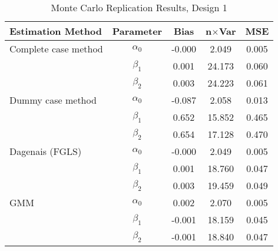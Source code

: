 \begin{table}
\centering
\caption{Monte Carlo Replication Results, Design 1}
\label{table:MCReplicationResultsDesign1}
\begin{tabular}{lcccc}
\toprule
Estimation Method & Parameter & Bias & n$\times$Var & MSE \\
\midrule
Complete case method & $\alpha_0$ & -0.000 & 2.049 & 0.005 \\
 & $\beta_1$ & 0.001 & 24.173 & 0.060 \\
 & $\beta_2$ & 0.003 & 24.223 & 0.061 \\
Dummy case method & $\alpha_0$ & -0.087 & 2.058 & 0.013 \\
 & $\beta_1$ & 0.652 & 15.852 & 0.465 \\
 & $\beta_2$ & 0.654 & 17.128 & 0.470 \\
Dagenais (FGLS) & $\alpha_0$ & -0.000 & 2.049 & 0.005 \\
 & $\beta_1$ & 0.001 & 18.760 & 0.047 \\
 & $\beta_2$ & 0.003 & 19.459 & 0.049 \\
GMM & $\alpha_0$ & 0.002 & 2.070 & 0.005 \\
 & $\beta_1$ & -0.001 & 18.159 & 0.045 \\
 & $\beta_2$ & -0.001 & 18.840 & 0.047 \\
\bottomrule
\end{tabular}
\end{table}
